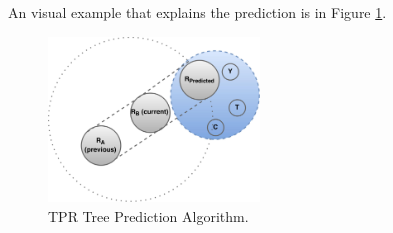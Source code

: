 An visual example that explains the prediction is in Figure \ref{fig:tpr}.

\begin{figure}[ht]
  \centering
    \includegraphics[width=0.5\textwidth]{TPR}
  \caption{TPR Tree Prediction Algorithm.}
  \label{fig:tpr}
\end{figure}